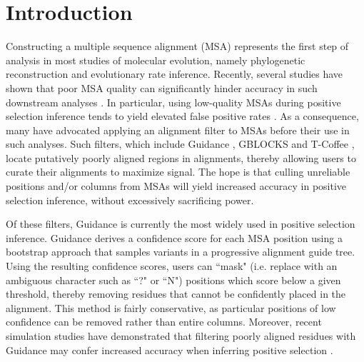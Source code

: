 \documentclass[10pt]{article}
\begin{document}
\section*{Introduction}
Constructing a multiple sequence alignment (MSA) represents the first step of analysis in most studies of molecular evolution, namely phylogenetic reconstruction and evolutionary rate inference. Recently, several studies have shown that poor MSA quality can significantly hinder accuracy in such downstream analyses \citep{Jordan2011, MarkovaRaina2011, Dwivedi2009, Talavera2007, Ogden2006}. In particular, using low-quality MSAs during positive selection inference tends to yield elevated false positive rates \citep{Jordan2011, Privman2012, Schneider2009, Fletcher2010}. As a consequence, many have advocated applying an alignment filter to MSAs before their use in such analyses. Such filters, which include Guidance \citep{Penn2010, Privman2012}, GBLOCKS \citep{Castresana2000} and T-Coffee \citep{Notredame2000}, locate putatively poorly aligned regions in alignments, thereby allowing users to curate their alignments to maximize signal. The hope is that culling unreliable positions and/or columns from MSAs will yield increased accuracy in positive selection inference, without excessively sacrificing power.

Of these filters, Guidance \citep{Penn2010} is currently the most widely used in positive selection inference. Guidance derives a confidence score for each MSA position using a bootstrap approach that samples variants in a progressive alignment guide tree. Using the resulting confidence scores, users can ``mask" (i.e. replace with an ambiguous character such as ``?" or ``N") positions which score below a given threshold, thereby removing residues that cannot be confidently placed in the alignment. This method is fairly conservative, as particular positions of low confidence can be removed rather than entire columns. Moreover, recent simulation studies have demonstrated that filtering poorly aligned residues with Guidance may confer increased accuracy when inferring positive selection \citep{Jordan2011,Privman2012}. 
\end{document}
